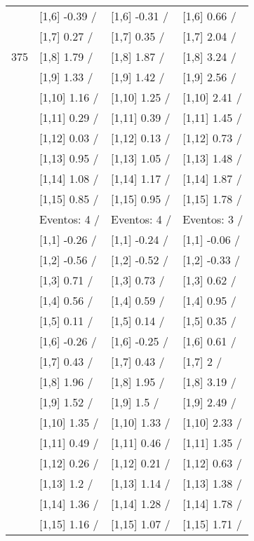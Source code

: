 \begin{table}
\begin{tabular}[t]{llll}
 & {}[1,6] -0.39  / & {}[1,6] -0.31  / & {}[1,6] 0.66  /\\
 & {}[1,7] 0.27  / & {}[1,7] 0.35  / & {}[1,7] 2.04  /\\
375 & {}[1,8] 1.79  / & {}[1,8] 1.87  / & {}[1,8] 3.24  /\\
\addlinespace
 & {}[1,9] 1.33  / & {}[1,9] 1.42  / & {}[1,9] 2.56  /\\
 & {}[1,10] 1.16  / & {}[1,10] 1.25  / & {}[1,10] 2.41  /\\
 & {}[1,11] 0.29  / & {}[1,11] 0.39  / & {}[1,11] 1.45  /\\
 & {}[1,12] 0.03  / & {}[1,12] 0.13  / & {}[1,12] 0.73  /\\
 & {}[1,13] 0.95  / & {}[1,13] 1.05  / & {}[1,13] 1.48  /\\
\addlinespace
 & {}[1,14] 1.08  / & {}[1,14] 1.17  / & {}[1,14] 1.87  /\\
 & {}[1,15] 0.85  / & {}[1,15] 0.95  / & {}[1,15] 1.78  /\\
 & Eventos:  4 / & Eventos:  4 / & Eventos:  3 /\\
 & {}[1,1] -0.26  / & {}[1,1] -0.24  / & {}[1,1] -0.06  /\\
 & {}[1,2] -0.56  / & {}[1,2] -0.52  / & {}[1,2] -0.33  /\\
\addlinespace
 & {}[1,3] 0.71  / & {}[1,3] 0.73  / & {}[1,3] 0.62  /\\
 & {}[1,4] 0.56  / & {}[1,4] 0.59  / & {}[1,4] 0.95  /\\
 & {}[1,5] 0.11  / & {}[1,5] 0.14  / & {}[1,5] 0.35  /\\
 & {}[1,6] -0.26  / & {}[1,6] -0.25  / & {}[1,6] 0.61  /\\
 & {}[1,7] 0.43  / & {}[1,7] 0.43  / & {}[1,7] 2  /\\
\addlinespace
500 & {}[1,8] 1.96  / & {}[1,8] 1.95  / & {}[1,8] 3.19  /\\
 & {}[1,9] 1.52  / & {}[1,9] 1.5  / & {}[1,9] 2.49  /\\
 & {}[1,10] 1.35  / & {}[1,10] 1.33  / & {}[1,10] 2.33  /\\
 & {}[1,11] 0.49  / & {}[1,11] 0.46  / & {}[1,11] 1.35  /\\
 & {}[1,12] 0.26  / & {}[1,12] 0.21  / & {}[1,12] 0.63  /\\
\addlinespace
 & {}[1,13] 1.2  / & {}[1,13] 1.14  / & {}[1,13] 1.38  /\\
 & {}[1,14] 1.36  / & {}[1,14] 1.28  / & {}[1,14] 1.78  /\\
 & {}[1,15] 1.16  / & {}[1,15] 1.07  / & {}[1,15] 1.71  /\\
\bottomrule
\end{tabular}
\end{table}
